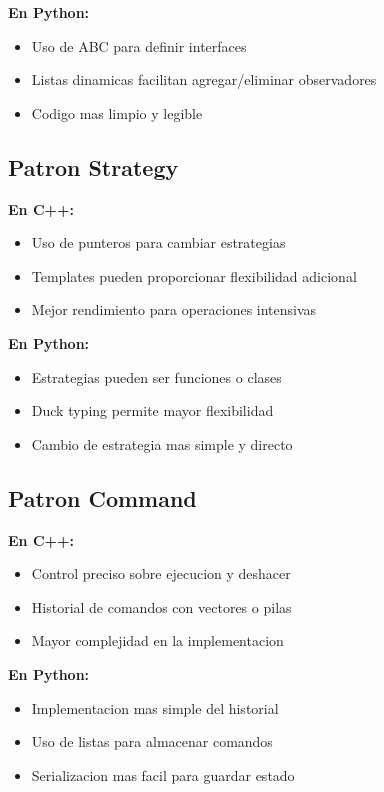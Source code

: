 \documentclass[11pt,a4paper]{article}
\begin{document}
\textbf{En Python:}
\begin{itemize}
    \item Uso de ABC para definir interfaces
    \item Listas dinamicas facilitan agregar/eliminar observadores
    \item Codigo mas limpio y legible
\end{itemize}

\subsection{Patron Strategy}

\textbf{En C++:}
\begin{itemize}
    \item Uso de punteros para cambiar estrategias
    \item Templates pueden proporcionar flexibilidad adicional
    \item Mejor rendimiento para operaciones intensivas
\end{itemize}

\textbf{En Python:}
\begin{itemize}
    \item Estrategias pueden ser funciones o clases
    \item Duck typing permite mayor flexibilidad
    \item Cambio de estrategia mas simple y directo
\end{itemize}

\subsection{Patron Command}

\textbf{En C++:}
\begin{itemize}
    \item Control preciso sobre ejecucion y deshacer
    \item Historial de comandos con vectores o pilas
    \item Mayor complejidad en la implementacion
\end{itemize}

\textbf{En Python:}
\begin{itemize}
    \item Implementacion mas simple del historial
    \item Uso de listas para almacenar comandos
    \item Serializacion mas facil para guardar estado
\end{itemize}
\end{document}
